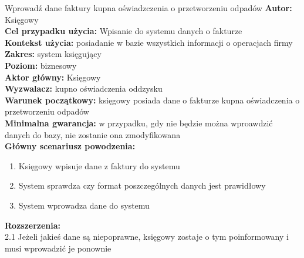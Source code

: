 \begin{usecase}{Wprowadź dane faktury kupna oświadzczenia o przetworzeniu odpadów}
	\textbf{Autor:} Księgowy\\
	\textbf{Cel przypadku użycia:} Wpisanie do systemu danych o fakturze \\
	\textbf{Kontekst użycia:} posiadanie w bazie wszystkich informacji o operacjach firmy\\
	\textbf{Zakres:} system księgujący \\
	\textbf{Poziom:} biznesowy \\
	\textbf{Aktor główny:} Księgowy \\
	\textbf{Wyzwalacz:} kupno oświadczenia oddzysku \\
	\textbf{Warunek początkowy:} księgowy posiada dane o fakturze kupna oświadczenia o przetworzeniu odpadów \\
	\textbf{Minimalna gwarancja:} w przypadku, gdy nie będzie można wproawdzić danych do bazy, nie zostanie ona zmodyfikowana \\
	\textbf{Główny scenariusz powodzenia:} 
		\begin{enumerate}
			\item Księgowy wpisuje dane z faktury do systemu
			\item System sprawdza czy format poszczególnych danych jest prawidłowy
			\item System wprowadza dane do systemu
		\end{enumerate}
	\textbf{Rozszerzenia:} \\
	2.1 Jeżeli jakieś dane są niepoprawne, księgowy zostaje o tym poinformowany i musi wprowadzić je ponownie
\end{usecase}

